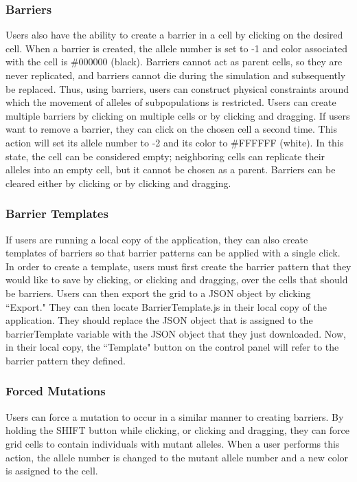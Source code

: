 \documentclass[12pt]{article}
\begin{document}
\begin{spacing}{1.6}
\subsubsection{Barriers}
Users also have the ability to create a barrier in a cell by clicking on the desired cell. When a barrier is created, the allele number is set to -1 and color associated with the cell is \#000000 (black). Barriers cannot act as parent cells, so they are never replicated, and barriers cannot die during the simulation and subsequently be replaced. Thus, using barriers, users can construct physical constraints around which the movement of alleles of subpopulations is restricted. Users can create multiple barriers by clicking on multiple cells or by clicking and dragging. If users want to remove a barrier, they can click on the chosen cell a second time. This action will set its allele number to -2 and its color to \#FFFFFF (white). In this state, the cell can be considered empty; neighboring cells can replicate their alleles into an empty cell, but it cannot be chosen as a parent. Barriers can be cleared either by clicking or by clicking and dragging.

\subsubsection{Barrier Templates}
If users are running a local copy of the application, they can also create templates of barriers so that barrier patterns can be applied with a single click. In order to create a template, users must first create the barrier pattern that they would like to save by clicking, or clicking and dragging, over the cells that should be barriers. Users can then export the grid to a JSON object by clicking ``Export." They can then locate BarrierTemplate.js in their local copy of the application. They should replace the JSON object that is assigned to the barrierTemplate variable with the JSON object that they just downloaded. Now, in their local copy, the ``Template" button on the control panel will refer to the barrier pattern they defined.

\subsubsection{Forced Mutations}
Users can force a mutation to occur in a similar manner to creating barriers. By holding the SHIFT button while clicking, or clicking and dragging, they can force grid cells to contain individuals with mutant alleles. When a user performs this action, the allele number is changed to the mutant allele number and a new color is assigned to the cell.


\end{spacing}
\end{document}

